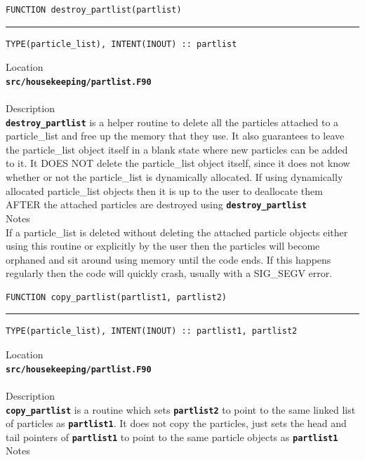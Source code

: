 \documentclass[12pt,a4paper]{article}
\newcommand{\HRule}{\rule{\linewidth}{0.5mm}}
\newcommand{\inlinecode}[1]{{\color{warwickred} \bf\texttt{#1}}}
\newcommand{\codedef}{\begin{Verbatim}[formatcom=\color{warwickred},fontsize=\Large,hfuzz=0pt]}
\newcommand{\coderule}{
{\color{warwickred}\vspace{-0.5cm}\HRule}
\codedef}
\begin{document}
\pagebreak
\codedef
FUNCTION destroy_partlist(partlist)
\end{Verbatim}
\coderule
TYPE(particle_list), INTENT(INOUT) :: partlist
\end{Verbatim}
\vspace{1cm}
{\Large Location\\}
\inlinecode{src/housekeeping/partlist.F90}\\
\\[0.5cm]
{\Large Description\\}
\inlinecode{destroy\_partlist} is a helper routine to delete all the particles
attached to a particle\_list and free up the memory that they use. It also
guarantees to leave the particle\_list object itself in a blank state where new
particles can be added to it. It DOES NOT delete the particle\_list object
itself, since it does not know whether or not the particle\_list is dynamically
allocated. If using dynamically allocated particle\_list objects then it is up
to the user to deallocate them AFTER the attached particles are destroyed using
\inlinecode{destroy\_partlist}
\\[0.5cm]
{\Large Notes\\}
If a particle\_list is deleted without deleting the attached particle objects
either using this routine or explicitly by the user then the particles will
become orphaned and sit around using memory until the code ends. If this
happens regularly then the code will quickly crash, usually with a SIG\_SEGV
error.

\pagebreak
\codedef
FUNCTION copy_partlist(partlist1, partlist2)
\end{Verbatim}
\coderule
TYPE(particle_list), INTENT(INOUT) :: partlist1, partlist2
\end{Verbatim}
\vspace{1cm}
{\Large Location\\}
\inlinecode{src/housekeeping/partlist.F90}\\
\\[0.5cm]
{\Large Description\\}
\inlinecode{copy\_partlist} is a routine which sets \inlinecode{partlist2} to
point to the same linked list of particles as \inlinecode{partlist1}. It does
not copy the particles, just sets the head and tail pointers of
\inlinecode{partlist1} to point to the same particle objects as
\inlinecode{partlist1}
\\[0.5cm]
{\Large Notes\\}
\end{document}
